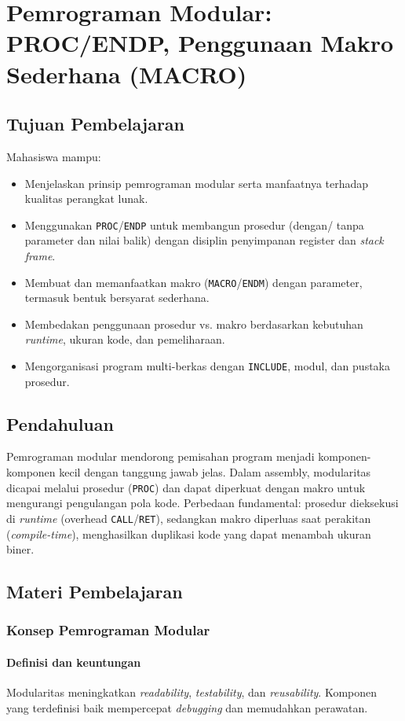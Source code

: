 \chapter{Pemrograman Modular: PROC/ENDP, Penggunaan Makro Sederhana (MACRO)}

\section{Tujuan Pembelajaran}
Mahasiswa mampu:
\begin{itemize}
  \item Menjelaskan prinsip pemrograman modular serta manfaatnya terhadap kualitas perangkat lunak.
  \item Menggunakan \texttt{PROC}/\texttt{ENDP} untuk membangun prosedur (dengan/ tanpa parameter dan nilai balik) dengan disiplin penyimpanan register dan \textit{stack frame}.
  \item Membuat dan memanfaatkan makro (\texttt{MACRO}/\texttt{ENDM}) dengan parameter, termasuk bentuk bersyarat sederhana.
  \item Membedakan penggunaan prosedur vs. makro berdasarkan kebutuhan \textit{runtime}, ukuran kode, dan pemeliharaan.
  \item Mengorganisasi program multi-berkas dengan \texttt{INCLUDE}, modul, dan pustaka prosedur.
\end{itemize}

\section{Pendahuluan}
Pemrograman modular mendorong pemisahan program menjadi komponen-komponen kecil dengan tanggung jawab jelas. Dalam assembly, modularitas dicapai melalui prosedur (\texttt{PROC}) dan dapat diperkuat dengan makro untuk mengurangi pengulangan pola kode. Perbedaan fundamental: prosedur dieksekusi di \textit{runtime} (overhead \texttt{CALL}/\texttt{RET}), sedangkan makro diperluas saat perakitan (\textit{compile-time}), menghasilkan duplikasi kode yang dapat menambah ukuran biner.

\section{Materi Pembelajaran}
\subsection{Konsep Pemrograman Modular}
\subsubsection{Definisi dan keuntungan}
Modularitas meningkatkan \textit{readability}, \textit{testability}, dan \textit{reusability}. Komponen yang terdefinisi baik mempercepat \textit{debugging} dan memudahkan perawatan.

